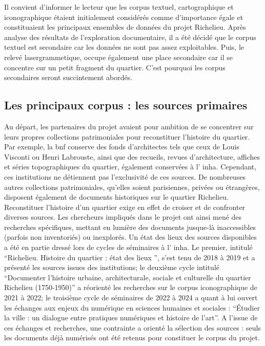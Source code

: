 Il convient d'informer le lecteur que les corpus textuel, cartographique et iconographique étaient initialement considérés comme d'importance égale et constituaient les principaux ensembles de données du projet Richelieu. Après analyse des résultats de l'exploration documentaire, il a été décidé que le corpus textuel est secondaire car les données ne sont pas assez exploitables. Puis, le relevé lasergrammetique, occupe également une place secondaire car il se concentre sur un petit fragment du quartier. C'est pourquoi les corpus secondaires seront succintement abordés. 


\subsection{Les principaux corpus : les sources primaires}
Au départ, les partenaires du projet avaient pour ambition de se concentrer sur leurs propres collections patrimoniales pour reconstituer l'histoire du quartier. Par exemple, la \acrshort{bnf} conserve des fonds d'architectes tels que ceux de Louis Visconti ou Henri Labrouste, ainsi que des recueils, revues d'architecture, affiches et séries topographiques du quartier, également conservées à l' \acrshort{inha}. Cependant, ces institutions ne détiennent pas l'exclusivité de ces sources. De nombreuses autres collections patrimoniales, qu'elles soient parisiennes, privées ou étrangères, disposent également de documents historiques sur le quartier Richelieu. Reconstituer l'histoire d'un quartier exige en effet de croiser et de confronter diverses sources. Les chercheurs impliqués dans le projet ont ainsi mené des recherches spécifiques, mettant en lumière des documents jusque-là inaccessibles (parfois non inventoriés) ou inexplorés. Un état des lieux des sources disponibles a été en partie dressé lors de cycles de séminaires à l' \acrshort{inha}. Le premier, intitulé \enquote{Richelieu. Histoire du quartier : état des lieux }, s'est tenu de 2018 à 2019 et a présenté les sources issues des institutions; le deuxième cycle intitulé \enquote{Documenter l'histoire urbaine, architecturale, sociale et culturelle du quartier Richelieu (1750-1950)} a réorienté les recherches sur le corpus iconographique de 2021 à 2022; le troisième cycle  de séminaires de 2022 à 2024 a quant à lui ouvert les échanges aux enjeux du numérique en sciences humaines et sociales : \enquote{Étudier la ville : un dialogue entre pratiques numériques et histoire de l'art}. A l'issue de ces échanges et recherches, une contrainte a orienté la sélection des sources : seuls les documents déjà numérisés ont été retenus pour constituer le corpus du projet. 

